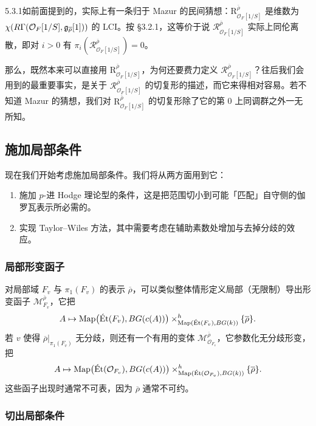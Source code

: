 \begin{rem}{5.3.1}\label{thm:a6-03-9}如前面提到的，实际上有一条归于 Mazur 的民间猜想：$\mathrm R^{\overline\rho}_{\mathcal O_F[1/S]}$ 是维数为 $\chi(R\Gamma(\mathcal O_F[1/S],\mathfrak{g}_{\overline\rho}[1]))$ 的 LCI。按 §3.2.1，这等价于说 $\mathcal R^{\overline\rho}_{\mathcal O_F[1/S]}$ 实际上同伦离散，即对 $i>0$ 有 $\pi_i(\mathcal R^{\overline\rho}_{\mathcal O_F[1/S]})=0$。

那么，既然本来可以直接用 $\mathrm R^{\overline\rho}_{\mathcal O_F[1/S]}$，为何还要费力定义 $\mathcal R^{\overline\rho}_{\mathcal O_F[1/S]}$？往后我们会用到的最重要事实，是关于 $\mathcal R^{\overline\rho}_{\mathcal O_F[1/S]}$ 的切复形的描述，而它来得相对容易。若不知道 Mazur 的猜想，我们对 $\mathrm R^{\overline\rho}_{\mathcal O_F[1/S]}$ 的切复形除了它的第 0 上同调群之外一无所知。
\end{rem}

\subsection{施加局部条件}

现在我们开始考虑施加局部条件。我们将从两方面用到它：
\begin{enumerate}[leftmargin=1.8em]
\item 施加 $p$-进 Hodge 理论型的条件，这是把范围切小到可能「匹配」自守侧的伽罗瓦表示所必需的。
\item 实现 Taylor--Wiles 方法，其中需要考虑在辅助素数处增加与去掉分歧的效应。
\end{enumerate}

\subsubsection{局部形变函子}

对局部域 $F_v$ 与 $\pi_1(F_v)$ 的表示 $\overline\rho$，可以类似整体情形定义局部（无限制）导出形变函子 $\mathcal M^{\overline\rho}_{F_v}$，它把
\[
A\mapsto \operatorname{Map}\bigl(\text{\'Et}(F_v),BG(c(A))\bigr)\times^{h}_{\operatorname{Map}(\text{\'Et}(F_v),BG(k))}\{\overline\rho\}.
\]
若 $v$ 使得 $\overline\rho|_{\pi_1(F_v)}$ 无分歧，则还有一个有用的变体 $\mathcal M^{\overline\rho}_{\mathcal O_{F_v}}$，它参数化无分歧形变，把
\[
A\mapsto \operatorname{Map}\bigl(\text{\'Et}(\mathcal O_{F_v}),BG(c(A))\bigr)\times^{h}_{\operatorname{Map}(\text{\'Et}(\mathcal O_{F_v}),BG(k))}\{\overline\rho\}.
\]
这些函子出现时通常不可表，因为 $\overline\rho$ 通常不可约。

\subsubsection{切出局部条件}

